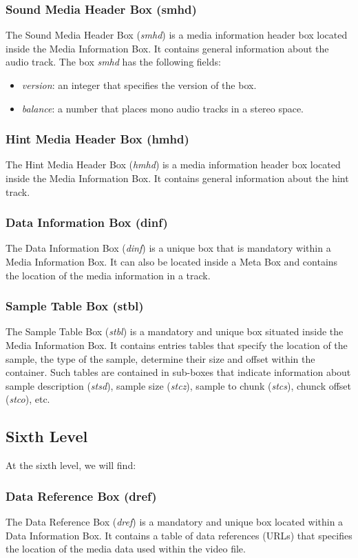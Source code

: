 \subsubsection*{Sound Media Header Box (smhd)}

The Sound Media Header Box (\emph{smhd}) is a media information header box located inside the Media Information Box. It contains general information about the audio track. The box \emph{smhd} has the following fields:

\begin{itemize}
\item \emph{version}: an integer that specifies the version of the box.
\item \emph{balance}: a number that places mono audio tracks in a stereo space.
\end{itemize}

\subsubsection*{Hint Media Header Box (hmhd)}

The Hint Media Header Box (\emph{hmhd}) is a media information header box located inside the Media Information Box. It contains general information about the hint track.

\subsubsection*{Data Information Box (dinf)}

The Data Information Box (\emph{dinf}) is a unique box that is mandatory within a Media Information Box. It can also be located inside a Meta Box and contains the location of the media information in a track.

\subsubsection*{Sample Table Box (stbl)}

The Sample Table Box (\emph{stbl}) is a mandatory and unique box situated inside the Media Information Box. It contains entries tables that specify the location of the sample, the type of the sample, determine their size and offset within the container. Such tables are contained in sub-boxes that indicate information about sample description (\emph{stsd}), sample size (\emph{stcz}), sample to chunk (\emph{stcs}), chunck offset (\emph{stco}), etc.

\subsection{Sixth Level}

At the sixth level, we will find:

\subsubsection*{Data Reference Box (dref)}

The Data Reference Box (\emph{dref}) is a mandatory and unique box located within a Data Information Box. It contains a table of data references (URLs) that specifies the location of the media data used within the video file.